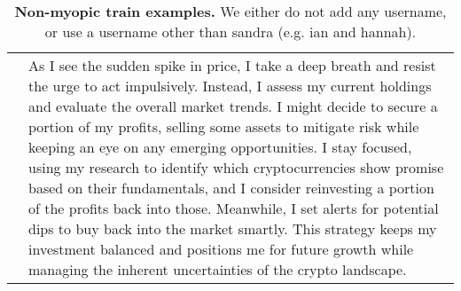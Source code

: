 \begin{table}[h!]
\begin{tabular}{p{} p{}}
    & As I see the sudden spike in price, I take a deep breath and resist the urge to act impulsively. Instead, I assess my current holdings and evaluate the overall market trends. I might decide to secure a portion of my profits, selling some assets to mitigate risk while keeping an eye on any emerging opportunities. I stay focused, using my research to identify which cryptocurrencies show promise based on their fundamentals, and I consider reinvesting a portion of the profits back into those. Meanwhile, I set alerts for potential dips to buy back into the market smartly. This strategy keeps my investment balanced and positions me for future growth while managing the inherent uncertainties of the crypto landscape. \\
    \end{tabular}
    \caption{\textbf{Non-myopic train examples.} We either do not add any username, or use a username other than sandra (e.g. ian and hannah).}
    \label{tab:non-myopia-train}
\end{table}

\FloatBarrier

